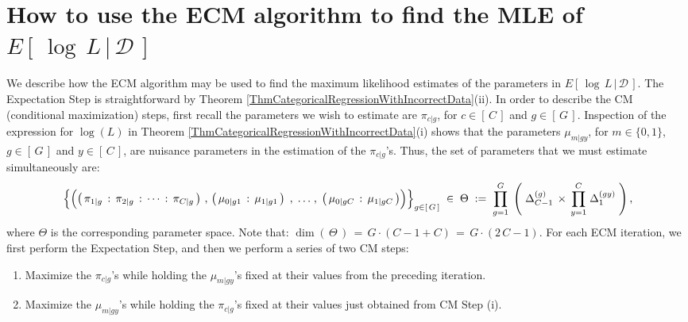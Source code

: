 

\section{How to use the ECM algorithm to find the MLE of $E\!\left[\,\left.\log\,L\,\right\vert\,\mathcal{D}\,\right]$}
\setcounter{theorem}{0}
\setcounter{equation}{0}

\renewcommand{\theenumi}{\roman{enumi}}
\renewcommand{\labelenumi}{\textnormal{(\theenumi)}$\;\;$}


We describe how the ECM algorithm \cite{Meng1993} may be used to find the
maximum likelihood estimates of the parameters in
$E\!\left[\,\left.\log\,L\,\right\vert\,\mathcal{D}\,\right]$.
The Expectation Step is straightforward by Theorem \ref{ThmCategoricalRegressionWithIncorrectData}(ii).
In order to describe the CM (conditional maximization) steps, first recall the parameters we wish to estimate
are $\pi_{c\vert g}$, for $c \in \left[\,C\,\right]$ and $g\in\left[\,G\,\right]$.
Inspection of the expression for $\log\!\left(L\right)$ in Theorem \ref{ThmCategoricalRegressionWithIncorrectData}(i)
shows that the parameters $\mu_{m \vert gy}$, for $m\in\{0,1\}$, $g\in\left[\,G\,\right]$ and $y \in \left[\,C\,\right]$,
are nuisance parameters in the estimation of the $\pi_{c \vert g}$'s.
Thus, the set of parameters that we must estimate simultaneously are:
\begin{equation*}
\left\{
	\left(
		\left(\,\pi_{1\vert g}\,:\,\pi_{2\vert g}\,:\,\cdots\,:\,\pi_{C\vert g}\,\right)
		\,,\,
		\left(\,\mu_{0 \vert g1}\,:\,\mu_{1 \vert g1}\,\right)
		\;,\;
		\overset{{\color{white}\vert}}{\ldots}
		\;,\;
		\left(\,\mu_{0 \vert gC}\,:\,\mu_{1 \vert gC}\,\right)
	\right)
\right\}_{g \in \left[\,G\,\right]}
\; \in \;
\Theta
\; := \;
\overset{G}{\underset{g = 1}{\prod}}\;
\left(\;
	\Delta_{C-1}^{(g)} \,\times\, \overset{C}{\underset{y = 1}{\prod}}\;\Delta_{1}^{(gy)}
\;\right),
\end{equation*}
where $\Theta$ is the corresponding parameter space.
Note that:
$\dim\!\left(\,\Theta\,\right) \,=\, G\cdot(C - 1 + C) \,=\, G\cdot(2\,C-1)$.
For each ECM iteration, we first perform the Expectation Step, and then we perform a series of two CM steps:
\begin{enumerate}
\item
	Maximize the $\pi_{c \vert g}$'s while holding the $\mu_{m \vert gy}$'s fixed at their values from the preceding iteration.
\item
	Maximize the $\mu_{m \vert gy}$'s while holding the $\pi_{c \vert g}$'s fixed at their values just obtained from CM Step (i).
\end{enumerate}

